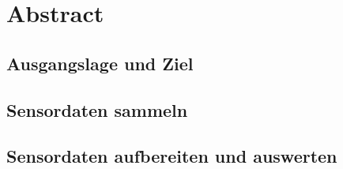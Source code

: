 
\section*{Abstract}

\subsection*{Ausgangslage und Ziel}


\subsection*{Sensordaten sammeln}


\subsection*{Sensordaten aufbereiten und auswerten}


